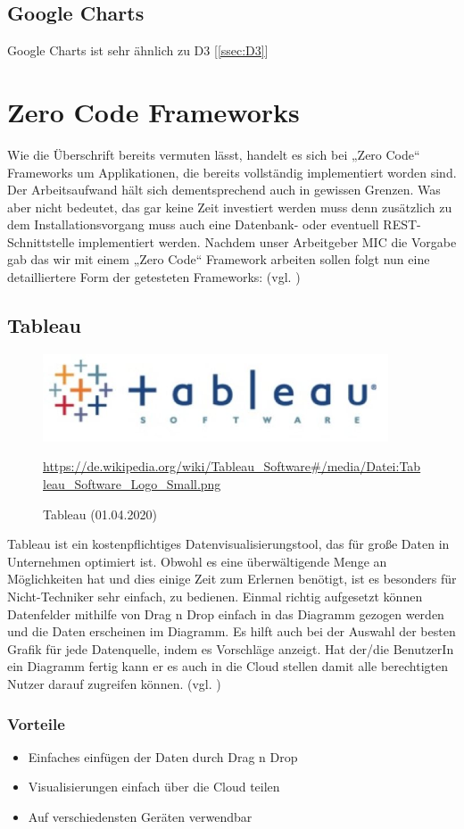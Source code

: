 \subsection{Google Charts}
Google Charts ist sehr ähnlich zu D3 [\ref{ssec:D3}] 
\section{Zero Code Frameworks}
Wie die Überschrift bereits vermuten lässt, handelt es sich bei „Zero Code“ Frameworks um Applikationen, die bereits vollständig implementiert worden sind. Der Arbeitsaufwand hält sich dementsprechend auch in gewissen Grenzen. Was aber nicht bedeutet, das gar keine Zeit investiert werden muss denn zusätzlich zu dem Installationsvorgang muss auch eine Datenbank- oder eventuell REST-Schnittstelle implementiert werden. Nachdem unser Arbeitgeber MIC die Vorgabe gab das wir mit einem „Zero Code“ Framework arbeiten sollen folgt nun eine detailliertere Form der getesteten Frameworks: (vgl. \cite{Anfang})
\subsection{Tableau}
\begin{figure}[H]
    \includegraphics[scale=1]{images/tableauLogo.PNG}
    \caption{Tableau (01.04.2020)}
    \centering
    \url{https://de.wikipedia.org/wiki/Tableau_Software#/media/Datei:Tableau_Software_Logo_Small.png} 
\end{figure}
Tableau ist ein kostenpflichtiges Datenvisualisierungstool, das für große Daten in Unternehmen optimiert ist. Obwohl es eine überwältigende Menge an Möglichkeiten hat und dies einige Zeit zum Erlernen benötigt, ist es besonders für Nicht-Techniker sehr einfach, zu bedienen. Einmal richtig aufgesetzt können Datenfelder mithilfe von Drag n Drop einfach in das Diagramm gezogen werden und die Daten erscheinen im Diagramm. Es hilft auch bei der Auswahl der besten Grafik für jede Datenquelle, indem es Vorschläge anzeigt. Hat der/die BenutzerIn ein Diagramm fertig kann er es auch in die Cloud stellen damit alle berechtigten Nutzer darauf zugreifen können. (vgl. \cite{noauthor_tableau_2019-1})
\subsubsection{Vorteile}
\begin{itemize}
\item Einfaches einfügen der Daten durch Drag n Drop
\item Visualisierungen einfach über die Cloud teilen
\item Auf verschiedensten Geräten verwendbar
\end{itemize}
